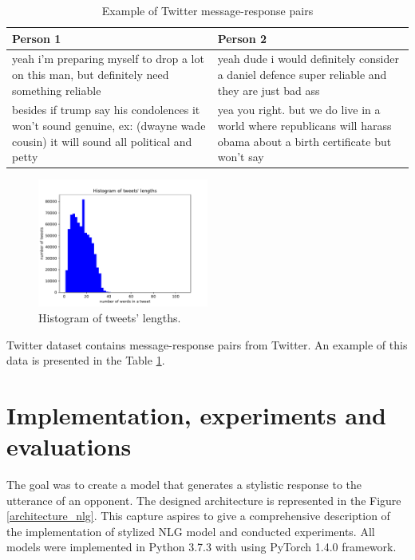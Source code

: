 \begin{table}[ht]
\centering
 \begin{tabular}{|p{7cm}|p{7cm}|} 
 \hline\hline
 \textbf{Person 1} & \textbf{Person 2} \\
 \hline\hline
 yeah i'm preparing myself to drop a lot on this man, but definitely need something reliable & yeah dude i would definitely consider a daniel defence super reliable and they are just bad ass \\ 
 \hline
 besides if trump say his condolences it won't sound genuine, ex: (dwayne wade cousin) it will sound all political and petty & yea you right. but we do live in a world where republicans will harass obama about a birth certificate but won't say \\
 \hline\hline
 \end{tabular}
 \caption{Example of Twitter message-response pairs}
\label{tab:twitter_chat}
\end{table}


\begin{figure}[hbt]
  \centering
  \includegraphics[width=0.5\textwidth]{figures/tweet.pdf}
  \caption{Histogram of tweets' lengths.}
  \label{tweet}
\end{figure}

Twitter dataset contains message-response pairs from Twitter. An example of this data is presented in the Table \ref{tab:twitter_chat}. 


\chapter{Implementation, experiments and evaluations}
The goal was to create a model that generates a stylistic response to the utterance of an opponent. The designed architecture is represented in the Figure \ref{architecture_nlg}. This capture aspires to give a comprehensive description of the implementation of stylized NLG model and conducted experiments. All models were implemented in Python 3.7.3 with using PyTorch 1.4.0 framework.


